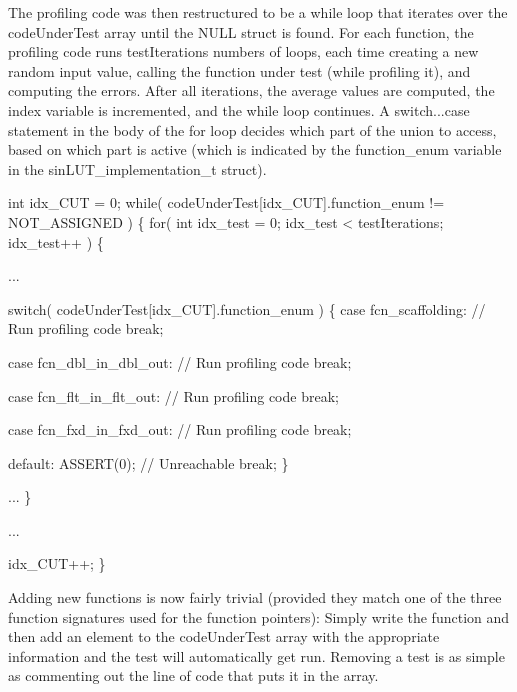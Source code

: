  The profiling code was then restructured to be a {\ttfamily while} loop that iterates over the {\ttfamily code\+Under\+Test} array until the {\ttfamily N\+U\+LL} struct is found. For each function, the profiling code runs {\ttfamily test\+Iterations} numbers of loops, each time creating a new random input value, calling the function under test (while profiling it), and computing the errors. After all iterations, the average values are computed, the index variable is incremented, and the {\ttfamily while} loop continues. A {\ttfamily switch...case} statement in the body of the {\ttfamily for} loop decides which part of the union to access, based on which part is active (which is indicated by the {\ttfamily function\+\_\+enum} variable in the {\ttfamily sin\+L\+U\+T\+\_\+implementation\+\_\+t} struct). 
\begin{DoxyCode}
int idx\_CUT = 0;
    while( codeUnderTest[idx\_CUT].function\_enum != NOT\_ASSIGNED )
    \{
        for( int idx\_test = 0; idx\_test < testIterations; idx\_test++ )
        \{

            ...

            switch( codeUnderTest[idx\_CUT].function\_enum )
            \{
                case fcn\_scaffolding:
                    // Run profiling code
                break;

                case fcn\_dbl\_in\_dbl\_out:
                    // Run profiling code
                break;

                case fcn\_flt\_in\_flt\_out:
                    // Run profiling code
                break;

                case fcn\_fxd\_in\_fxd\_out:
                    // Run profiling code
                break;

                default:
                    ASSERT(0);
                // Unreachable
                break;
            \}           

            ...
        \}

        ...

        idx\_CUT++;
    \}
\end{DoxyCode}
 Adding new functions is now fairly trivial (provided they match one of the three function signatures used for the function pointers)\+: Simply write the function and then add an element to the {\ttfamily code\+Under\+Test} array with the appropriate information and the test will automatically get run. Removing a test is as simple as commenting out the line of code that puts it in the array.

